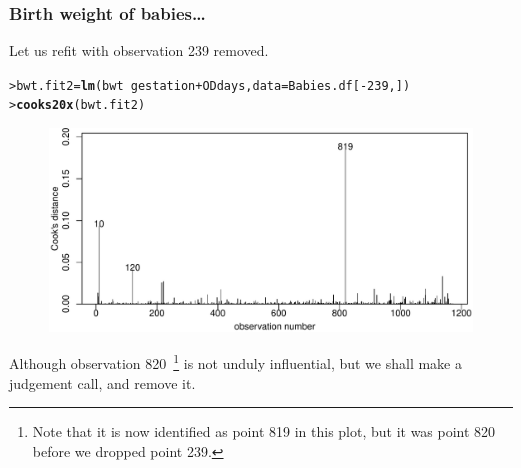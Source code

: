 \documentclass{beamer}\usepackage[]{graphicx}\usepackage[]{xcolor}
\makeatletter
\newcommand{\hlnum}[1]{\textcolor[rgb]{0.686,0.059,0.569}{#1}}%
\newcommand{\hlopt}[1]{\textcolor[rgb]{0,0,0}{#1}}%
\newcommand{\hlstd}[1]{\textcolor[rgb]{0.345,0.345,0.345}{#1}}%
\newcommand{\hlkwb}[1]{\textcolor[rgb]{0.69,0.353,0.396}{#1}}%
\newcommand{\hlkwc}[1]{\textcolor[rgb]{0.333,0.667,0.333}{#1}}%
\newcommand{\hlkwd}[1]{\textcolor[rgb]{0.737,0.353,0.396}{\textbf{#1}}}%
\newenvironment{kframe}{%
 \def\at@end@of@kframe{}%
 \ifinner\ifhmode%
  \def\at@end@of@kframe{\end{minipage}}%
  \begin{minipage}{\columnwidth}%
 \fi\fi%
 \def\FrameCommand##1{\hskip\@totalleftmargin \hskip-\fboxsep
 \colorbox{shadecolor}{##1}\hskip-\fboxsep
     \hskip-\linewidth \hskip-\@totalleftmargin \hskip\columnwidth}%
 \MakeFramed {\advance\hsize-\width
   \@totalleftmargin\z@ \linewidth\hsize
   \@setminipage}}%
 {\par\unskip\endMakeFramed%
 \at@end@of@kframe}
\newenvironment{knitrout}{}{} %
\makeatother
\begin{document}
\begin{frame}[fragile]
\frametitle{Birth weight of babies\ldots}
Let us refit with observation 239 removed.
\begin{knitrout}\scriptsize
{}\color{fgcolor}\begin{kframe}
\begin{alltt}
\hlstd{> }\hlstd{bwt.fit2}\hlkwb{=}\hlkwd{lm}\hlstd{(bwt}\hlopt{~} \hlstd{gestation}\hlopt{+}\hlstd{ODdays,}\hlkwc{data} \hlstd{= Babies.df[}\hlopt{-}\hlnum{239}\hlstd{,])}
\hlstd{> }\hlkwd{cooks20x}\hlstd{(bwt.fit2)}
\end{alltt}
\end{kframe}
\end{knitrout}



\begin{figure}
  \centering
  \includegraphics[scale = 0.5]{figure/RC-H10-026}
\end{figure}

Although observation 820~\footnote{Note that it is now identified as point 819 in this plot, but it was point 820 before we dropped point 239.} is not unduly influential,
but we shall make a judgement call, and remove it.
\end{frame}
\end{document}
